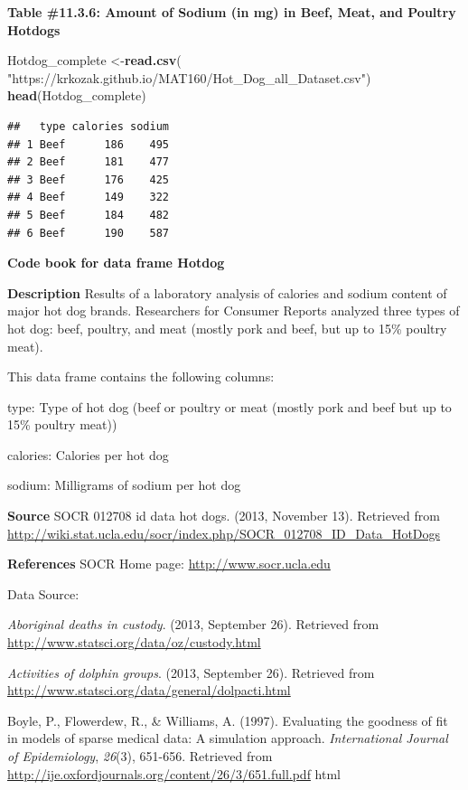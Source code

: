 \documentclass[
]{book}
\newenvironment{Shaded}{\begin{snugshade}}{\end{snugshade}}
\newcommand{\KeywordTok}[1]{\textcolor[rgb]{0.13,0.29,0.53}{\textbf{#1}}}
\newcommand{\NormalTok}[1]{#1}
\newcommand{\StringTok}[1]{\textcolor[rgb]{0.31,0.60,0.02}{#1}}
\begin{document}
\textbf{Table \#11.3.6: Amount of Sodium (in mg) in Beef, Meat, and Poultry Hotdogs}

\begin{Shaded}
\begin{Highlighting}[]
\NormalTok{Hotdog_complete <-}\KeywordTok{read.csv}\NormalTok{(}
  \StringTok{"https://krkozak.github.io/MAT160/Hot_Dog_all_Dataset.csv"}\NormalTok{)}
\KeywordTok{head}\NormalTok{(Hotdog_complete)}
\end{Highlighting}
\end{Shaded}

\begin{verbatim}
##   type calories sodium
## 1 Beef      186    495
## 2 Beef      181    477
## 3 Beef      176    425
## 4 Beef      149    322
## 5 Beef      184    482
## 6 Beef      190    587
\end{verbatim}

\textbf{Code book for data frame Hotdog}

\textbf{Description}
Results of a laboratory analysis of calories and sodium content of major hot dog brands. Researchers for Consumer Reports analyzed three types of hot dog: beef, poultry, and meat (mostly pork and beef, but up to 15\% poultry meat).

This data frame contains the following columns:

type: Type of hot dog (beef or poultry or meat (mostly pork and beef but up to 15\% poultry meat))

calories: Calories per hot dog

sodium: Milligrams of sodium per hot dog

\textbf{Source}
SOCR 012708 id data hot dogs. (2013, November 13). Retrieved from
\url{http://wiki.stat.ucla.edu/socr/index.php/SOCR_012708_ID_Data_HotDogs}

\textbf{References}
SOCR Home page: \url{http://www.socr.ucla.edu}

Data Source:

\emph{Aboriginal deaths in custody}. (2013, September 26). Retrieved from
\url{http://www.statsci.org/data/oz/custody.html}

\emph{Activities of dolphin groups}. (2013, September 26). Retrieved from
\url{http://www.statsci.org/data/general/dolpacti.html}

Boyle, P., Flowerdew, R., \& Williams, A. (1997). Evaluating the goodness
of fit in models of sparse medical data: A simulation approach.
\emph{International Journal of Epidemiology}, \emph{26}(3), 651-656. Retrieved
from \url{http://ije.oxfordjournals.org/content/26/3/651.full.pdf} html
\end{document}
